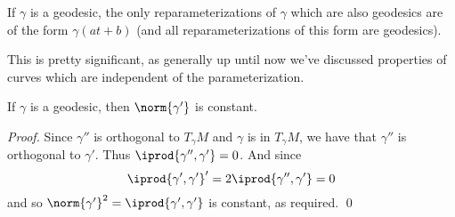 \begin{prop*}

    If $\gamma$ is a geodesic, the only reparameterizations of $\gamma$ which are also geodesics are of the form $\gamma(at+b)$ (and all reparameterizations of this form are geodesics).

\end{prop*}

This is pretty significant, as generally up until now we've discussed properties of curves which are independent of the parameterization.

\begin{prop*}

    If $\gamma$ is a geodesic, then $\norm{\gamma'}$ is constant.

\end{prop*}

\begin{proof}

    Since $\gamma''$ is orthogonal to $T_\gamma M$ and $\gamma$ is in $T_\gamma M$, we have that $\gamma''$ is orthogonal to $\gamma'$.
    Thus $\iprod{\gamma'',\gamma'}=0$.
    And since
    \[ \iprod{\gamma',\gamma'}' = 2\iprod{\gamma'',\gamma'} = 0 \]
    and so $\norm{\gamma'}^2=\iprod{\gamma',\gamma'}$ is constant, as required.
    \qed

\end{proof}

